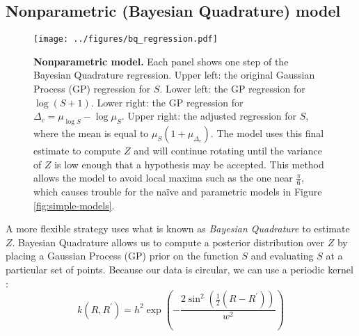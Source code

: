 \documentclass{article} %
\newcommand{\naive}[0]{na\"ive}
\begin{document}
\subsection{Nonparametric (Bayesian Quadrature) model}

\begin{figure}[t]
  \centering
  \texttt{[image: ../figures/bq\_regression.pdf]}
  \caption{\textbf{Nonparametric model.} Each panel shows one step of
    the Bayesian Quadrature regression. Upper left: the original
    Gaussian Process (GP) regression for $S$. Lower left: the GP
    regression for $\log(S+1)$. Lower right: the GP regression for
    $\Delta_c=\mu_{\log S} - \log \mu_S$. Upper right: the adjusted
    regression for $S$, where the mean is equal to
    $\mu_S(1+\mu_{\Delta_c})$. The model uses this final estimate to
    compute $Z$ and will continue rotating until the variance of $Z$
    is low enough that a hypothesis may be accepted. This method
    allows the model to avoid local maxima such as the one near
    $\frac{\pi}{6}$, which causes trouble for the \naive{} and
    parametric models in Figure \ref{fig:simple-models}.}
  \label{fig:bq}
\end{figure}

A more flexible strategy uses what is known as \emph{Bayesian
  Quadrature} \cite{Diaconis:1988uo,OHagan:1991tx} to estimate $Z$.
Bayesian Quadrature allows us to compute a posterior distribution over
$Z$ by placing a Gaussian Process (GP) prior on the function $S$ and
evaluating $S$ at a particular set of points. Because our data is
circular, we can use a periodic kernel \cite{Rasmussen:2006vz}:
\begin{equation}
k(R, R^\prime)=h^2\exp\left(-\frac{2\sin^2\left(\frac{1}{2}(R-R^\prime)\right)}{w^2}\right)
\end{equation}
\end{document}
